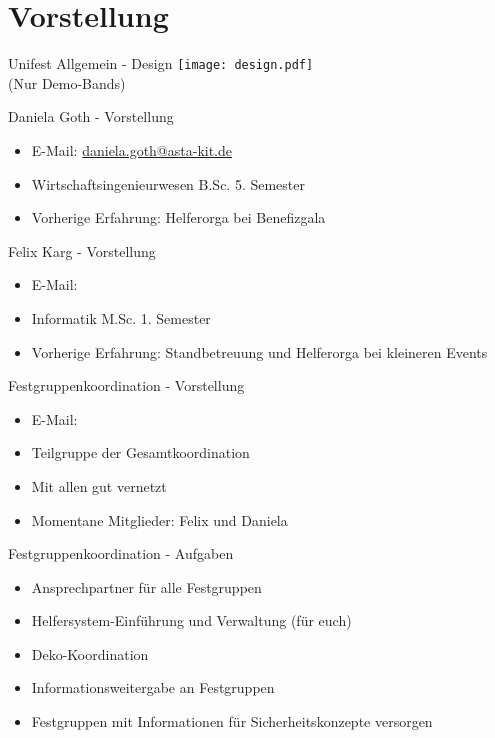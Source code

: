 \section{Vorstellung}

\begin{frame}[c]{Unifest Allgemein - Design}
    \texttt{[image: design.pdf]} \\
    (Nur Demo-Bands)
\end{frame}


\begin{frame}[c]{Daniela Goth - Vorstellung}
    \begin{itemize}[<+(1)->]
        \item E-Mail: \href{mailto:daniela.goth@asta-kit.de}{daniela.goth@asta-kit.de}
        \item Wirtschaftsingenieurwesen B.Sc. 5. Semester
        \item Vorherige Erfahrung: Helferorga bei Benefizgala
    \end{itemize}
\end{frame}


\begin{frame}[c]{Felix Karg - Vorstellung}
    \begin{itemize}[<+(1)->]
        \item E-Mail: 
        \item Informatik M.Sc. 1. Semester
        \item Vorherige Erfahrung: Standbetreuung und Helferorga bei kleineren Events
    \end{itemize}
\end{frame}


\begin{frame}[c]{Festgruppenkoordination - Vorstellung}
    \begin{itemize}[<+(1)->]
        \item E-Mail: 
        \item Teilgruppe der Gesamtkoordination
        \item Mit allen gut vernetzt
        \item Momentane Mitglieder: Felix und Daniela
    \end{itemize}
\end{frame}


\begin{frame}[c]{Festgruppenkoordination - Aufgaben}
    \begin{itemize}[<+(1)->]
        \item Ansprechpartner für alle Festgruppen
        \item Helfersystem-Einführung und Verwaltung (für euch)
        \item Deko-Koordination
        \item Informationsweitergabe an Festgruppen
        \item Festgruppen mit Informationen für Sicherheitskonzepte versorgen
    \end{itemize}
\end{frame}



